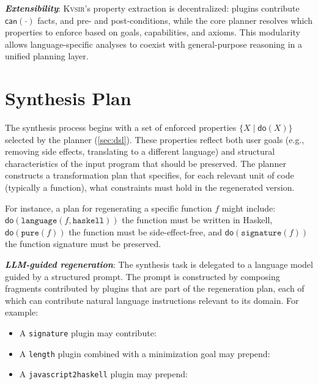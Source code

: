 \documentclass[sigplan]{acmart}
\newcommand{\sys}{{\scshape Kv{\textalpha}sir}\xspace}
\newcommand{\heading}[1]{\vspace{2pt}\noindent\textbf{\emph{#1}}:\enspace}
\newcommand{\ttt}[1]{\texttt{#1}}
\begin{document}
\heading{Extensibility}
\sys's property extraction is decentralized: plugins contribute $\mathsf{can}(\cdot)$ facts, and pre- and post-conditions, while the core planner resolves which properties to enforce based on goals, capabilities, and axioms.
This modularity allows language-specific analyses to coexist with general-purpose reasoning in a unified planning layer.

\section{Synthesis Plan}

The synthesis process begins with a set of enforced properties $\{ X \mid \mathsf{do}(X) \}$ selected by the planner (\cref{sec:dsl}). These properties reflect both user goals (e.g., removing side effects, translating to a different language) and structural characteristics of the input program that should be preserved. The planner constructs a transformation plan that specifies, for each relevant unit of code (typically a function), what constraints must hold in the regenerated version.

For instance, a plan for regenerating a specific function $f$ might include:
\(\mathsf{do}(\texttt{language}(f, \texttt{haskell}))\) the function must be written in Haskell, 
\(\mathsf{do}(\texttt{pure}(f))\) the function must be side-effect-free, and 
\(\mathsf{do}(\texttt{signature}(f))\) the function signature must be preserved.

\heading{LLM-guided regeneration}
The synthesis task is delegated to a language model guided by a structured prompt. The prompt is constructed by composing fragments contributed by plugins that are part of the regeneration plan, each of which can contribute natural language instructions relevant to its domain. For example:
\begin{itemize}
  \item A \ttt{signature} plugin may contribute: \emph{}
  \item A \ttt{length} plugin combined with a minimization goal may prepend: \emph{}
  \item A \ttt{javascript2haskell} plugin may prepend: \emph{}
\end{itemize}
\end{document}
